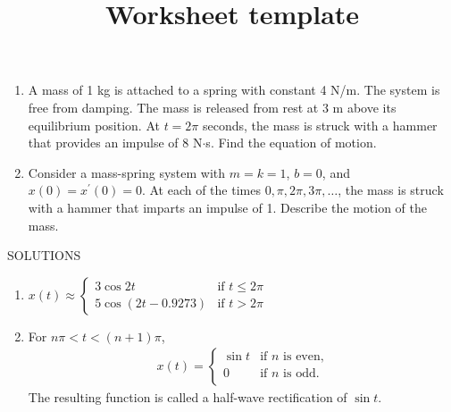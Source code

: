 \documentclass[12pt]{article}
\title{Worksheet template}
\begin{document}
\bigskip
\bigskip

\begin{enumerate}

	\item A mass of 1 kg is attached to a spring with constant 4 N/m.  The system is free from
    damping.  The mass is released from rest at 3 m above its equilibrium position.  At $t = 2\pi$ seconds, 
    the mass is struck with a hammer that provides an impulse of 8 N$\cdot$s.  Find the equation of motion.
    
    \item Consider a mass-spring system with $m=k=1$, $b=0$, and $x(0) = x^{\prime}(0) = 0$.  At each of the 
    times $0, \pi, 2\pi, 3\pi, \ldots$, the mass is struck with a hammer that imparts an impulse of 1.  
    Describe the motion of the mass.  
\end{enumerate}

\clearpage
SOLUTIONS
\newline
\bigskip
\begin{enumerate}
\item $x(t) \approx \begin{cases}
	3 \cos 2t & \mbox{if } t \le 2\pi \\
    5 \cos \left( 2t - 0.9273 \right) & \mbox{if } t > 2\pi
   \end{cases}$
\item For $n\pi < t < (n+1) \pi$, 
	\begin{gather*}
    x(t) = \begin{cases}
	\sin t & \mbox{if } n \mbox{ is even,} \\
	0 & \mbox{if } n \mbox{ is odd.} \\
   \end{cases}
   \end{gather*}
The resulting function is called a half-wave rectification of $\sin t$.
\end{enumerate}
\end{document}
